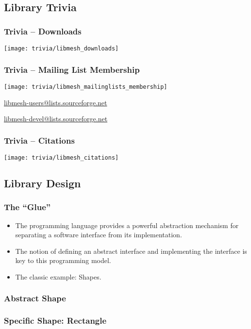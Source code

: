 \subsection{Library Trivia}
\frame
{
  \frametitle{Trivia -- Downloads}
  \begin{center}
    \texttt{[image: trivia/libmesh\_downloads]}
  \end{center}
}       

\frame
{
  \frametitle{Trivia -- Mailing List Membership}
  \begin{center}
    \texttt{[image: trivia/libmesh\_mailinglists\_membership]}
    
    \small
    
    \url{libmesh-users@lists.sourceforge.net}

    \url{libmesh-devel@lists.sourceforge.net}
  \end{center}
}       

\frame
{
  \frametitle{Trivia -- Citations}
  \begin{center}
    \texttt{[image: trivia/libmesh\_citations]}
  \end{center}
}       


\subsection{Library Design}
\frame
{
  \frametitle{The ``Glue''}
  \begin{itemize}
    \item The \cpp{} programming language provides a powerful abstraction mechanism for separating a software interface from its implementation.
    \item The notion of  defining an abstract interface and  implementing the interface is key to this programming model.
      \pause
    \item The classic \cpp{} example: Shapes.
  \end{itemize}
  
}



\frame
{
  \frametitle{Abstract Shape}
  
}



\frame
{
  \frametitle{Specific Shape: Rectangle}
  
}



